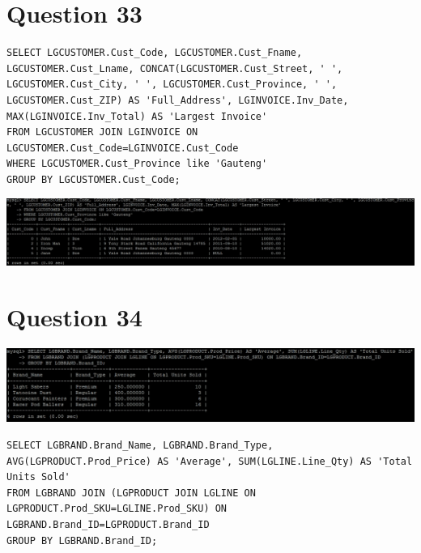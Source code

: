\documentclass[a4paper,10pt]{article}
\begin{document}
\section*{Question 33}
\lstset{
            language=SQL,
            breaklines=true
            }
        \begin{lstlisting}[frame=single]
        SELECT LGCUSTOMER.Cust_Code, LGCUSTOMER.Cust_Fname, LGCUSTOMER.Cust_Lname, CONCAT(LGCUSTOMER.Cust_Street, ' ', LGCUSTOMER.Cust_City, ' ', LGCUSTOMER.Cust_Province, ' ', LGCUSTOMER.Cust_ZIP) AS 'Full_Address', LGINVOICE.Inv_Date, MAX(LGINVOICE.Inv_Total) AS 'Largest Invoice'
FROM LGCUSTOMER JOIN LGINVOICE ON LGCUSTOMER.Cust_Code=LGINVOICE.Cust_Code
WHERE LGCUSTOMER.Cust_Province like 'Gauteng'
GROUP BY LGCUSTOMER.Cust_Code;

        \end{lstlisting}
\includegraphics{Queries/Question_33/Q33_screenshot.jpg}
\section*{Question 34}
\includegraphics{Queries/Question_34/Q34_screenshot.jpg}
\lstset{
            language=SQL,
            breaklines=true
            }
        \begin{lstlisting}[frame=single]
        SELECT LGBRAND.Brand_Name, LGBRAND.Brand_Type, AVG(LGPRODUCT.Prod_Price) AS 'Average', SUM(LGLINE.Line_Qty) AS 'Total Units Sold'
FROM LGBRAND JOIN (LGPRODUCT JOIN LGLINE ON LGPRODUCT.Prod_SKU=LGLINE.Prod_SKU) ON LGBRAND.Brand_ID=LGPRODUCT.Brand_ID
GROUP BY LGBRAND.Brand_ID;

        \end{lstlisting}
\end{document}

